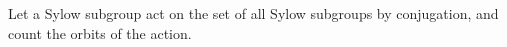 \documentclass[12pt]{article}
\begin{document}
Let a Sylow subgroup act on the set of all Sylow subgroups by conjugation, and count the orbits of the action.
\end{document}
